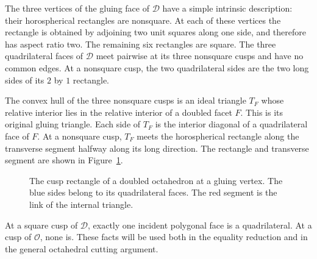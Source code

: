\documentclass[11pt]{article}
\theoremstyle{remark}
\newcommand{\OCT}{\mathcal O}
\newcommand{\DBL}{\mathcal D}
\begin{document}
The three vertices of the gluing face of $\DBL$ have a simple
intrinsic description: their horospherical rectangles are nonsquare.
At each of these vertices the rectangle is obtained by adjoining
two unit squares along one side, and therefore has aspect ratio two.
The remaining six rectangles are square. The three quadrilateral
faces of $\DBL$ meet pairwise at its three nonsquare cusps and have
no common edges. At a nonsquare cusp, the two quadrilateral sides
are the two long sides of its $2$ by $1$ rectangle.

The convex hull of the three nonsquare cusps is an ideal triangle
$T_F$ whose relative interior lies in the relative interior of a
doubled facet $F$. This is its
original gluing triangle. Each side of $T_F$ is the interior diagonal
of a quadrilateral face of $F$. At a nonsquare cusp, $T_F$ meets
the horospherical rectangle along the transverse segment halfway
along its long direction. The rectangle and transverse segment
are shown in Figure~\ref{fig:rectangle}.

\begin{figure}[htbp]
\centering
{}
\caption{The cusp rectangle of a doubled octahedron at a gluing
vertex. The blue sides belong to its quadrilateral faces. The red
segment is the link of the internal triangle.}
\label{fig:rectangle}
\end{figure}

At a square cusp of $\DBL$, exactly one incident polygonal face
is a quadrilateral. At a cusp of $\OCT$, none is. These facts will be used both in the equality reduction and in the
general octahedral cutting argument.
\end{document}

